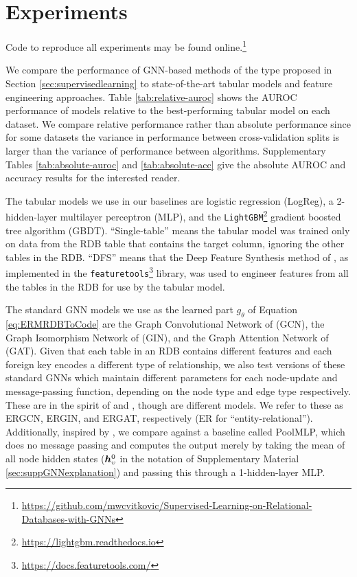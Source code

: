 \documentclass{article}
\begin{document}
\section{Experiments}
Code to reproduce all experiments may be found online.\footnote{\url{https://github.com/mwcvitkovic/Supervised-Learning-on-Relational-Databases-with-GNNs}}

We compare the performance of GNN-based methods of the type proposed in Section \ref{sec:supervisedlearning} to state-of-the-art tabular models and feature engineering approaches.  Table \ref{tab:relative-auroc} shows the AUROC performance of models relative to the best-performing tabular model on each dataset.  We compare relative performance rather than absolute performance since for some datasets the variance in performance between cross-validation splits is larger than the variance of performance between algorithms.  Supplementary Tables \ref{tab:absolute-auroc} and \ref{tab:absolute-acc} give the absolute AUROC and accuracy results for the interested reader.

The tabular models we use in our baselines are logistic regression (LogReg), a 2-hidden-layer multilayer perceptron (MLP), and the \texttt{LightGBM}\footnote{\url{https://lightgbm.readthedocs.io}} gradient boosted tree algorithm \citep{ke2017lightgbm} (GBDT).   ``Single-table'' means the tabular model was trained only on data from the RDB table that contains the target column, ignoring the other tables in the RDB.  ``DFS'' means that the Deep Feature Synthesis method of \citet{kanter_deep_2015}, as implemented in the \texttt{featuretools}\footnote{\url{https://docs.featuretools.com/}} library, was used to engineer features from all the tables in the RDB for use by the tabular model.

The standard GNN models we use as the learned part $g_\theta$ of Equation \ref{eq:ERMRDBToCode} are the Graph Convolutional Network of \citet{kipf2016semi} (GCN), the Graph Isomorphism Network of \citet{ginpaper} (GIN), and the Graph Attention Network of \citet{gatpaper} (GAT).  Given that each table in an RDB contains different features and each foreign key encodes a different type of relationship, we also test versions of these standard GNNs which maintain different parameters for each node-update and message-passing function, depending on the node type and edge type respectively.  These are in the spirit of \cite{Schlichtkrull2017ModelingRD} and \cite{wang2019heterogeneous}, though are different models.  We refer to these as ERGCN, ERGIN, and ERGAT, respectively (ER for ``entity-relational'').   Additionally, inspired by \cite{Luzhnica2019OnGC}, we compare against a baseline called PoolMLP, which does no message passing and computes the output merely by taking the mean of all node hidden states (${\bm{h}}_v^0$ in the notation of Supplementary Material \ref{sec:suppGNNexplanation}) and passing this through a 1-hidden-layer MLP.
\end{document}

